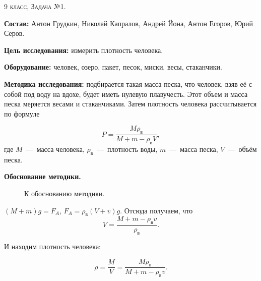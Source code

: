 \begin{center}
  \textsc{9 класс, Задача №1. }
\end{center}

\textbf{Состав:} Антон Грудкин, Николай Капралов, Андрей Йона, Антон
Егоров, Юрий Серов.

\textbf{Цель исследования:} измерить плотность человека. 

\textbf{Оборудование:} человек, озеро, пакет, песок, миски, весы, стаканчики.

\textbf{Методика исследования:} подбирается такая масса песка, что
человек, взяв её с собой под воду на вдохе, будет иметь нулевую
плавучесть. Этот объем и масса песка меряется весами и
стаканчиками. Затем плотность человека рассчитывается по формуле

\begin{equation}
  \label{eq:bz09_01}
  P = \frac{M \rho_{\text{в}}}{M + m - \rho_{\text{в}} V},
\end{equation}
где $M$~---~масса человека, $\rho_{\text{в}}$~---~плотность воды,
$m$~---~масса песка, $V$~---~объём песка. 

\begin{center}
  \textbf{Обоснование методики.}  
\end{center}

\begin{figure}[h]
  \centering
  \caption{К обоснованию методики.}
  \label{fig:bz09_density}
\end{figure}

$(M+m)g=F_A$, $F_A = \rho_{\text{в}} (V+v) g$. Отсюда получаем, что 
\begin{equation}
  \label{eq:bz09_1}
  V= \frac{M+m-\rho_{\text{в}} v} {\rho_{\text{в}}}.
\end{equation}

И находим плотность человека: 

\begin{equation}
  \label{eq:bz09_2}
  \rho = \frac{M}{V} = \frac{M \rho_{\text{в}}} {M+m-\rho_{\text{в}} v}.
\end{equation}

